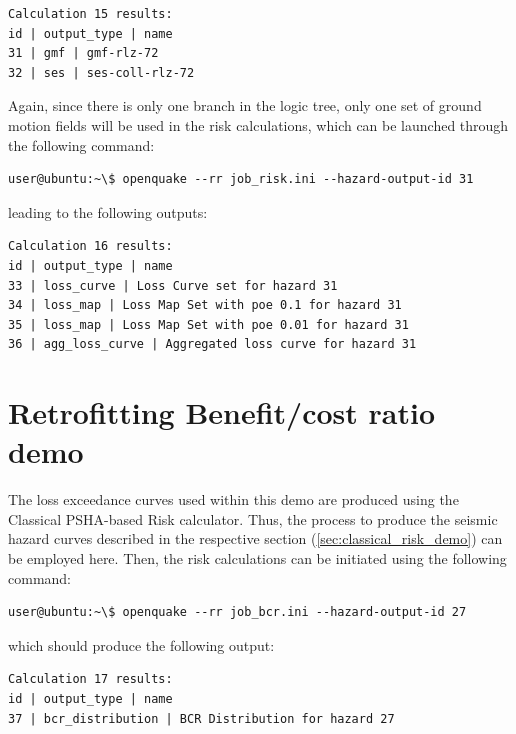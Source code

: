 \begin{Verbatim}[frame=single, commandchars=\\\{\}, samepage=true]
Calculation 15 results:
id | output_type | name
31 | gmf | gmf-rlz-72
32 | ses | ses-coll-rlz-72
\end{Verbatim}

Again, since there is only one branch in the logic tree, only one set of ground motion fields will be used in the risk calculations, which can be launched through the following command:

\begin{Verbatim}[frame=single, commandchars=\\\{\}, samepage=true]
user@ubuntu:~\$ openquake --rr job_risk.ini --hazard-output-id 31
\end{Verbatim}

leading to the following outputs:

\begin{Verbatim}[frame=single, commandchars=\\\{\}, samepage=true]
Calculation 16 results:
id | output_type | name
33 | loss_curve | Loss Curve set for hazard 31
34 | loss_map | Loss Map Set with poe 0.1 for hazard 31
35 | loss_map | Loss Map Set with poe 0.01 for hazard 31
36 | agg_loss_curve | Aggregated loss curve for hazard 31
\end{Verbatim}

\section{Retrofitting Benefit/cost ratio demo}
The loss exceedance curves used within this demo are produced using the Classical PSHA-based Risk calculator. Thus, the process to produce the seismic hazard curves described in the respective section (\ref{sec:classical_risk_demo}) can be employed here. Then, the risk calculations can be initiated using the following command:

\begin{Verbatim}[frame=single, commandchars=\\\{\}, samepage=true]
user@ubuntu:~\$ openquake --rr job_bcr.ini --hazard-output-id 27
\end{Verbatim}

which should produce the following output:

\begin{Verbatim}[frame=single, commandchars=\\\{\}, samepage=true]
Calculation 17 results:
id | output_type | name
37 | bcr_distribution | BCR Distribution for hazard 27
\end{Verbatim}